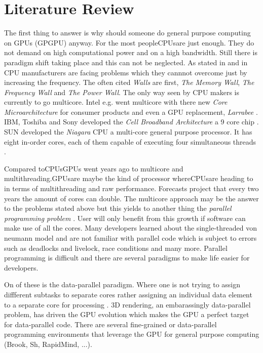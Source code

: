 \chapter{Literature Review}\label{ch:literature_review}
The first thing to answer is why should someone do general purpose computing on
GPUs (GPGPU) anyway. For the most people\glspl{CPU}are just enough. They do not
demand on high computational power and on a high bandwidth. Still there is
paradigm shift taking place and this can not be neglected. As stated in
\citep{citeulike:1187394} and in \citep{citeulike:3421647} CPU manufacturers are
facing problems which they cannnot overcome just by increasing the frequency.
The often cited \emph{Walls} are first, \emph{The Memory
Wall}\citep{citeulike:457955}, \emph{The Frequency Wall} and \emph{The Power
Wall}. The only way seen by CPU makers is currently to go multicore. Intel e.g.
went multicore with there new \emph{Core Microarchitecture} for consumer
products and even a \gls{GPU} replacement, \emph{Larrabee} \citep{citeulike:3153758}.
IBM, Toshiba and Sony developed the \emph{Cell Broadband Architecture} a 9 core
chip \citep{citeulike:1243173}. SUN developed the \emph{Niagara} CPU a multi-core
general purpose processor. It has eight in-order cores, each of them capable of
executing four simultaneous threads \citep{citeulike:3743958}.

Compared to\glspl{CPU}GPUs went years ago to multicore and multithreading.\glspl{GPU}are
maybe the kind of processor where\glspl{CPU}are heading to in terms of multithreading
and raw performance. Forecasts project that every two years the amount of cores
can double. The multicore approach may be the answer to the problems stated
above but this yields to another thing the \emph{parallel programming problem}
\citep{citeulike:3750573}. User will only benefit from this growth if software
can make use of all the cores. Many developers learned about the
single-threaded von neumann model and are not familiar with parallel code which
is subject to errors such as deadlocks and livelock, race conditions and many
more. Parallel programming is difficult and there are several paradigms to make
life easier for developers. 

On of these is the data-parallel paradigm. Where one
is not trying to assign diffferent subtasks to separate cores rather assigning
an individual data element to a separate core for processing
\citep{citeulike:3750565}. 3D rendering, an embarassingly data-parallel problem,
has driven the \gls{GPU} evolution which makes the \gls{GPU} a perfect target for
data-parallel code. There are several fine-grained or data-parallel programming
environments that leverage the \gls{GPU} for general purpose computing (Brook, Sh,
RapidMind, ...). 

